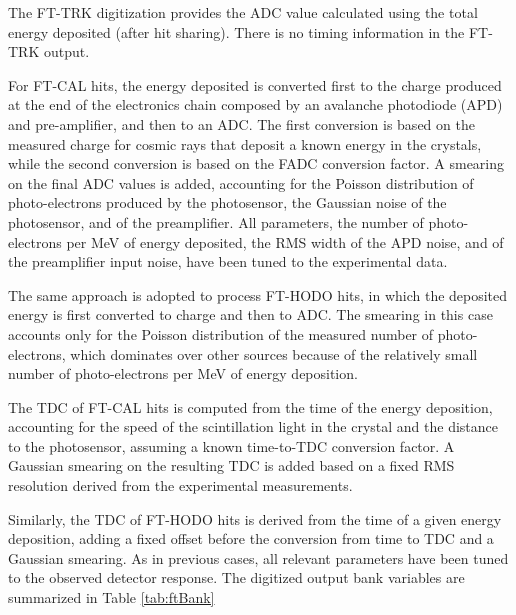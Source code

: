 The FT-TRK digitization provides the ADC value calculated using the total energy deposited (after hit sharing).
There is no timing information in the FT-TRK output.

For FT-CAL hits, the energy deposited is converted first to the charge produced at the end of the electronics chain composed
by an avalanche photodiode (APD) and pre-amplifier, and then to an ADC.
The first conversion is based on the measured charge for cosmic rays that deposit a known energy in the crystals,
while the second conversion is based on the FADC conversion factor. A smearing on the final ADC values is added,
accounting for the Poisson distribution of photo-electrons produced by the photosensor, the Gaussian noise of the
photosensor, and of the preamplifier. All parameters, the number of photo-electrons per MeV of energy deposited,
the RMS width of the APD noise, and of the preamplifier input noise, have been tuned to the experimental data.

The same approach is adopted to process FT-HODO hits, in which the deposited energy is first converted to charge and then to ADC.
The smearing in this case accounts only for the Poisson distribution of the measured number of photo-electrons,
which dominates over other sources because of the relatively small number of photo-electrons per MeV of energy deposition.

The TDC of FT-CAL hits is computed from the time of the energy deposition, accounting for the speed of the scintillation light in
the crystal and the distance to the photosensor, assuming a known time-to-TDC conversion factor. A Gaussian smearing on the
resulting TDC is added based on a fixed RMS resolution derived from the experimental measurements.

Similarly, the TDC of FT-HODO hits is derived from the time of a given energy deposition, adding a fixed offset before the
conversion from time to TDC and a Gaussian smearing. As in previous cases, all relevant parameters have been tuned to the
observed detector response.
The digitized output bank variables are summarized in Table \ref{tab:ftBank}

